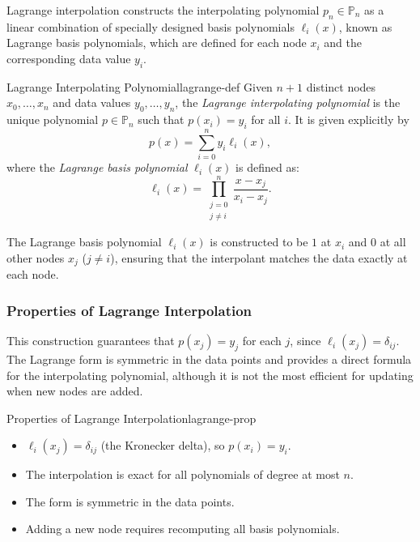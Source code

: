 Lagrange interpolation constructs the interpolating polynomial \(p_n \in \mathbb{P}_n\) as a linear combination of specially designed basis polynomials \(\ell_i(x)\), known as Lagrange basis polynomials, which are defined for each node \(x_i\) and the corresponding data value \(y_i\).

\begin{definition}{Lagrange Interpolating Polynomial}{lagrange-def}
    Given \(n+1\) distinct nodes \(x_0, \ldots, x_n\) and data values \(y_0, \ldots, y_n\), the \emph{Lagrange interpolating polynomial} is the unique polynomial \(p \in \mathbb{P}_n\) such that \(p(x_i) = y_i\) for all \(i\).
    It is given explicitly by
    \[
        p(x) = \sum_{i=0}^n y_i \ell_i(x),
    \]
    where the \emph{Lagrange basis polynomial} \(\ell_i(x)\) is defined as:
    \[
        \ell_i(x) = \prod_{\substack{j=0 \\ j \neq i}}^n \frac{x - x_j}{x_i - x_j}.
    \]
\end{definition}

The Lagrange basis polynomial \(\ell_i(x)\) is constructed to be \(1\) at \(x_i\) and \(0\) at all other nodes \(x_j\) (\(j \neq i\)), ensuring that the interpolant matches the data exactly at each node.

\subsubsection{Properties of Lagrange Interpolation}
This construction guarantees that \(p(x_j) = y_j\) for each \(j\), since \(\ell_i(x_j) = \delta_{ij}\). The Lagrange form is symmetric in the data points and provides a direct formula for the interpolating polynomial, although it is not the most efficient for updating when new nodes are added.

\begin{property}{Properties of Lagrange Interpolation}{lagrange-prop}
    \begin{itemize}[nosep]
        \item \(\ell_i(x_j) = \delta_{ij}\) (the Kronecker delta), so \(p(x_i) = y_i\).
        \item The interpolation is exact for all polynomials of degree at most \(n\).
        \item The form is symmetric in the data points.
        \item Adding a new node requires recomputing all basis polynomials.
    \end{itemize}
\end{property}

